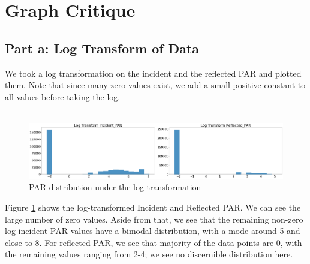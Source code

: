 \documentclass[11pt, letterpaper]{article}
\begin{document}
\section{Graph Critique}
\subsection{Part a: Log Transform of Data}
We took a log transformation on the incident and the reflected PAR and plotted them. Note that since many zero values exist, we add a small positive constant to all values before taking the log.
\\ \\
\begin{figure}[h!]
\centering
\includegraphics[width=1.0\textwidth]{Fig5_graph_critique_a.png}
\caption{PAR distribution under the log transformation}
\label{fig:graph_crtique_a}
\end{figure}
Figure \ref{fig:graph_crtique_a} shows the log-transformed Incident and Reflected PAR. We can see the large number of zero values. Aside from that, we see that the remaining non-zero log incident PAR values have a bimodal distribution, with a mode around 5 and close to 8. For reflected PAR, we see that majority of the data points are 0, with the remaining values ranging from 2-4; we see no discernible distribution here.
\end{document}
